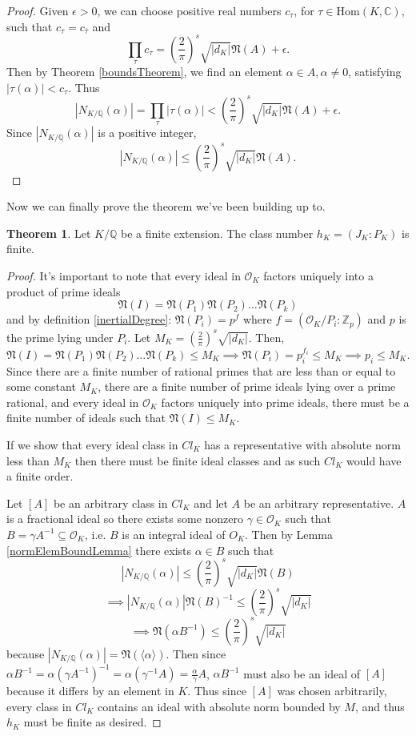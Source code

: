 \documentclass[12pt]{article}
\theoremstyle{definition}
\newtheorem{theorem}{Theorem}[section]
\begin{document}
\begin{proof}
    Given $\epsilon > 0$, we can choose positive real numbers $c_\tau$, for $\tau \in \text{Hom}(K, \mathbb{C})$, such that $c_\tau=c_{\bar{\tau}}$ and
    \[ \prod_{\tau}c_\tau = (\frac{2}{\pi})^s\sqrt{|d_K|}\mathfrak{N}(A)+\epsilon.\]
    Then by Theorem \ref{boundsTheorem}, we find an element $\alpha \in A, \alpha \neq 0$, satisfying $|\tau(\alpha)| < c_\tau$. Thus
    \[|N_{K/\mathbb{Q}}(\alpha)| = \prod_\tau|\tau(\alpha)| < (\frac{2}{\pi})^s\sqrt{|d_K|}\mathfrak{N}(A)+\epsilon. \]
    Since $|N_{K/\mathbb{Q}}(\alpha)|$ is a positive integer, 
    \[|N_{K/\mathbb{Q}}(\alpha)| \leq (\frac{2}{\pi})^s\sqrt{|d_K|}\mathfrak{N}(A). \]
\end{proof}
Now we can finally prove the theorem we've been building up to.
\begin{theorem}\cite{Eullery}
    Let $K/\mathbb{Q}$ be a finite extension. The class number $h_K=(J_K:P_K)$ is finite.
\end{theorem}

\begin{proof}
It's important to note that every ideal in $\mathcal{O}_K$ factors uniquely into a product of prime ideals
\[\mathfrak{N}(I) = \mathfrak{N}(P_1)\mathfrak{N}(P_2)\dots\mathfrak{N}(P_k) \]
and by definition \ref{inertialDegree}: $\mathfrak{N}(P_i) = p^f$ where $f = (\mathcal{O}_K/P_i:\mathbb{Z}_p)$ and $p$ is the prime lying under $P_i$.
Let $M_K = (\frac{2}{\pi})^s \sqrt{|d_K|}$. Then,
\[\mathfrak{N}(I) = \mathfrak{N}(P_1)\mathfrak{N}(P_2)\dots\mathfrak{N}(P_k) \leq M_K \implies \mathfrak{N}(P_i) = p_i^{f_i} \leq M_K \implies p_i \leq M_K.\]
Since there are a finite number of rational primes that are less than or equal to some constant $M_K$, there are a finite number of prime ideals lying over a prime rational,
and every ideal in $\mathcal{O}_K$ factors uniquely into prime ideals, there must be a finite number of ideals such that $\mathfrak{N}(I) \leq M_K$.

If we show that every ideal class in $Cl_K$ has a representative with absolute norm less than $M_K$ then there must be finite ideal classes and
as such $Cl_K$ would have a finite order. 

Let $[A]$ be an arbitrary class in $Cl_K$ and let $A$ be an arbitrary representative. $A$ is a fractional ideal so there exists some nonzero $\gamma \in \mathcal{O}_K$ such that
$B = \gamma A^{-1} \subseteq \mathcal{O}_K$, i.e. $B$ is an integral ideal of $O_K$. Then by Lemma \ref{normElemBoundLemma} there exists $\alpha \in B$ such that
\[|N_{K/\mathbb{Q}}(\alpha)| \leq (\frac{2}{\pi})^s\sqrt{|d_K|}\mathfrak{N}(B)\]
\[ \implies |N_{K/\mathbb{Q}}(\alpha)|\mathfrak{N}(B)^{-1} \leq (\frac{2}{\pi})^s\sqrt{|d_K|}\]
\[ \implies \mathfrak{N}(\alpha B^{-1}) \leq (\frac{2}{\pi})^s\sqrt{|d_K|}\]
because $|N_{K/\mathbb{Q}}(\alpha)|=\mathfrak{N}(\langle \alpha \rangle)$. Then since $\alpha B^{-1} = \alpha (\gamma A^{-1})^{-1} = \alpha (\gamma^{-1}A) = \frac{\alpha}{\gamma}A$, $\alpha B^{-1}$ must also be an ideal of $[A]$
because it differs by an element in $K$. Thus since $[A]$ was chosen arbitrarily, every class in $Cl_K$ contains an ideal with absolute norm bounded by $M$, and thus $h_K$ must be finite as desired. 
\end{proof}
\end{document}
